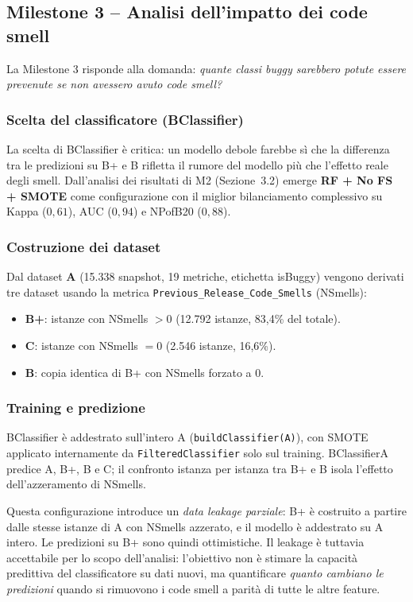 \subsection{Milestone 3 -- Analisi dell’impatto dei code smell}

La Milestone 3 risponde alla domanda: \textit{quante classi buggy sarebbero potute essere
prevenute se non avessero avuto code smell?}

\subsubsection{Scelta del classificatore (BClassifier)}

La scelta di BClassifier è critica: un modello debole farebbe sì che la differenza
tra le predizioni su B+ e B rifletta il rumore del modello più che l'effetto reale
degli smell. Dall'analisi dei risultati di M2 (Sezione~3.2) emerge \textbf{RF + No FS + SMOTE}
come configurazione con il miglior bilanciamento complessivo su Kappa ($0{,}61$),
AUC ($0{,}94$) e NPofB20 ($0{,}88$).

\subsubsection{Costruzione dei dataset}

Dal dataset \textbf{A} (15.338 snapshot, 19 metriche, etichetta isBuggy) vengono derivati
tre dataset usando la metrica \texttt{Previous\_Release\_Code\_Smells} (NSmells):
\begin{itemize}[noitemsep]
  \item \textbf{B+}: istanze con NSmells $> 0$ (12.792 istanze, 83,4\% del totale).
  \item \textbf{C}: istanze con NSmells $= 0$ (2.546 istanze, 16,6\%).
  \item \textbf{B}: copia identica di B+ con NSmells forzato a 0.
\end{itemize}

\subsubsection{Training e predizione}

BClassifier è addestrato sull'intero A (\texttt{buildClassifier(A)}), con SMOTE applicato
internamente da \texttt{FilteredClassifier} solo sul training. BClassifierA predice A, B+,
B e C; il confronto istanza per istanza tra B+ e B isola l'effetto dell'azzeramento di NSmells.

Questa configurazione introduce un \textit{data leakage parziale}: B+ è costruito a partire
dalle stesse istanze di A con NSmells azzerato, e il modello è addestrato su A intero.
Le predizioni su B+ sono quindi ottimistiche. Il leakage
è tuttavia accettabile per lo scopo dell'analisi: l'obiettivo non è stimare la capacità
predittiva del classificatore su dati nuovi, ma quantificare \textit{quanto cambiano le
predizioni} quando si rimuovono i code smell a parità di tutte le altre feature.


